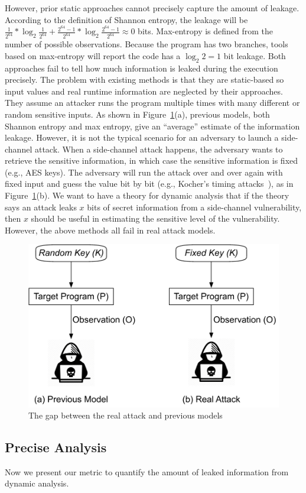 However, prior static approaches cannot precisely capture the amount of leakage. According to the definition of Shannon entropy, the leakage will be
$\frac{1}{2^{64}}*\log_{2}\frac{1}{2^{64}} + \frac{2^{64}-1}{2^{64}}
    *\log_{2}\frac{2^{64}-1}{2^{64}} \approx 0$ bits. Max-entropy is defined from the
number of possible observations. Because the program has two
branches, tools based on max-entropy will report the code has a $\log_2{2} = 1$
bit leakage.
Both approaches fail to tell how much information is leaked during the execution
precisely. The problem with existing methods is that they are static-based so
input values and real runtime information are neglected by their approaches.
They assume an attacker runs
the program multiple times with many different or random sensitive inputs. As
shown in Figure~\ref{fig:gap}(a), previous models, both Shannon entropy and max
entropy, give an ``average'' estimate of the information leakage. However, it is
not the typical scenario for an adversary to launch a side-channel attack. When
a side-channel attack happens, the adversary wants to retrieve the sensitive
information, in which case the sensitive information is fixed (e.g., AES keys).
The adversary will run the attack over and over again with fixed input and
guess the value bit by
bit (e.g., Kocher's timing attacks~\cite{kocher1996timing}), as in Figure~\ref{fig:gap}(b). We want to have a
theory for dynamic analysis that if the theory says an attack leaks $x$ bits of
secret information from a side-channel vulnerability, then $x$ should be useful
in estimating the sensitive level of the vulnerability. However, the above
methods all fail in real attack models.
\begin{figure}
    \centering
    \includegraphics[width=.65\columnwidth]{./figures/chapter4/RA.pdf}
    \caption{The gap between the real attack and previous models}\label{fig:gap}
\end{figure}

\subsection{Precise Analysis}
Now we present our metric to quantify the amount of leaked information from
dynamic analysis.


